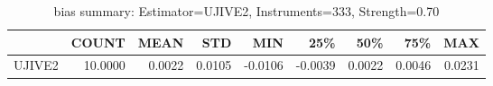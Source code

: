\begin{table}[ht]
\centering
\caption{bias summary: Estimator=UJIVE2, Instruments=333, Strength=0.70}
\begin{tabular}{lrrrrrrrr}
\toprule
 & COUNT & MEAN & STD & MIN & 25\% & 50\% & 75\% & MAX \\
\midrule
UJIVE2 & 10.0000 & 0.0022 & 0.0105 & -0.0106 & -0.0039 & 0.0022 & 0.0046 & 0.0231 \\
\bottomrule
\end{tabular}
\end{table}
